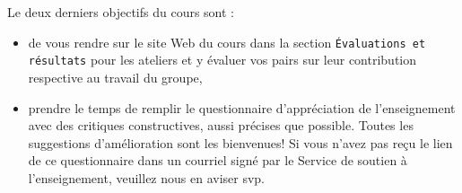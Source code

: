 \documentclass[canadien,12pt,oneside,letterpaper]{article}
\begin{document}
Le deux derniers objectifs du cours sont :

\begin{itemize}
    \item de vous rendre sur le site Web du cours dans la section \texttt{Évaluations et résultats} pour les ateliers et y évaluer vos pairs sur leur contribution respective au travail du groupe,
    \item prendre le temps de remplir le questionnaire d'appréciation de l'enseignement avec des critiques constructives, aussi précises que possible. Toutes les suggestions d'amélioration sont les bienvenues! Si vous n'avez pas reçu le lien de ce questionnaire dans un courriel signé par le Service de soutien à l’enseignement, veuillez nous en aviser svp.
\end{itemize}

\end{document}
